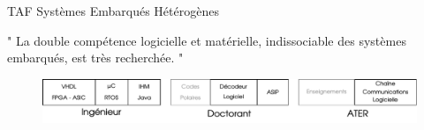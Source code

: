 \documentclass[t,compress,mathserif,12pt,xcolor=dvipsnames]{beamer}
\begin{document}
\begin{frame}[t]{TAF Systèmes Embarqués Hétérogènes}
  \begin{minipage}[t][5.0cm][t]{\textwidth}
  \centering
  \vspace{0.8cm}
              " La double compétence logicielle et matérielle, indissociable des systèmes embarqués, est très recherchée. "

  \end{minipage}
  \begin{figure}[htp]
    \centering
    \includegraphics[width=\textwidth]{fig/frise12}
  \end{figure}
\end{frame}
\end{document}
